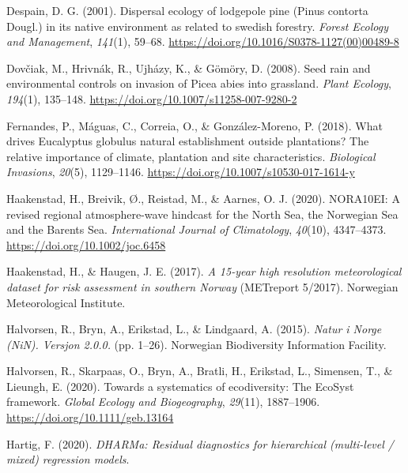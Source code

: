 \documentclass[
]{article}
\begin{document}
\leavevmode\hypertarget{ref-despainDispersalEcologyLodgepole2001}{}%
Despain, D. G. (2001). Dispersal ecology of lodgepole pine (Pinus contorta Dougl.) in its native environment as related to swedish forestry. \emph{Forest Ecology and Management}, \emph{141}(1), 59--68. \url{https://doi.org/10.1016/S0378-1127(00)00489-8}

\leavevmode\hypertarget{ref-dovciakSeedRainEnvironmental2008}{}%
Dovčiak, M., Hrivnák, R., Ujházy, K., \& Gömöry, D. (2008). Seed rain and environmental controls on invasion of Picea abies into grassland. \emph{Plant Ecology}, \emph{194}(1), 135--148. \url{https://doi.org/10.1007/s11258-007-9280-2}

\leavevmode\hypertarget{ref-fernandesWhatDrivesEucalyptus2018}{}%
Fernandes, P., Máguas, C., Correia, O., \& González-Moreno, P. (2018). What drives Eucalyptus globulus natural establishment outside plantations? The relative importance of climate, plantation and site characteristics. \emph{Biological Invasions}, \emph{20}(5), 1129--1146. \url{https://doi.org/10.1007/s10530-017-1614-y}

\leavevmode\hypertarget{ref-haakenstadNORA10EIRevisedRegional2020}{}%
Haakenstad, H., Breivik, Ø., Reistad, M., \& Aarnes, O. J. (2020). NORA10EI: A revised regional atmosphere-wave hindcast for the North Sea, the Norwegian Sea and the Barents Sea. \emph{International Journal of Climatology}, \emph{40}(10), 4347--4373. \url{https://doi.org/10.1002/joc.6458}

\leavevmode\hypertarget{ref-haakenstad15yearHighResolution2017}{}%
Haakenstad, H., \& Haugen, J. E. (2017). \emph{A 15-year high resolution meteorological dataset for risk assessment in southern Norway} (METreport 5/2017). Norwegian Meteorological Institute.

\leavevmode\hypertarget{ref-halvorsenNaturNorgeNiN2015}{}%
Halvorsen, R., Bryn, A., Erikstad, L., \& Lindgaard, A. (2015). \emph{Natur i Norge (NiN). Versjon 2.0.0.} (pp. 1--26). Norwegian Biodiversity Information Facility.

\leavevmode\hypertarget{ref-halvorsenSystematicsEcodiversityEcoSyst2020}{}%
Halvorsen, R., Skarpaas, O., Bryn, A., Bratli, H., Erikstad, L., Simensen, T., \& Lieungh, E. (2020). Towards a systematics of ecodiversity: The EcoSyst framework. \emph{Global Ecology and Biogeography}, \emph{29}(11), 1887--1906. \url{https://doi.org/10.1111/geb.13164}

\leavevmode\hypertarget{ref-hartigDHARMaResidualDiagnostics2020}{}%
Hartig, F. (2020). \emph{DHARMa: Residual diagnostics for hierarchical (multi-level / mixed) regression models}.
\end{document}
